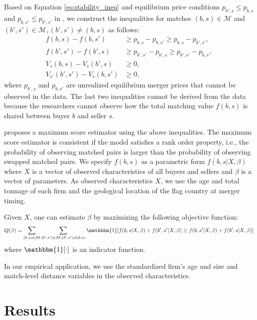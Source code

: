 \documentclass[10pt]{article}
\begin{document}
Based on Equation \eqref{eq:stability_ineq} and equilibrium price conditions $p_{b',s}\le p_{b,s}$ and $p_{b,s'}\le p_{b',s'}$ in \cite{akkus2015ms}, we construct the inequalities for matches $(b,s)\in \mathcal{M}$ and $(b',s')\in \mathcal{M}, (b',s')\neq(b,s)$ as follows:
\begin{align}
    f(b,s)-f(b,s')&\ge p_{b,s}-p_{b,s'}\ge p_{b,s}-p_{b',s'},\label{eq:pairwise_stable_ineq}\\
    f(b',s')-f(b',s)&\ge p_{b',s'}-p_{b',s}\ge p_{b',s'}-p_{b,s},\nonumber\\
    V_s(b,s)-V_s(b',s)&\ge 0,\nonumber\\
    V_{s'}(b',s')-V_s(b,s')&\ge 0,\nonumber
\end{align}
where $p_{b',s}$ and $p_{b,s'}$ are unrealized equilibrium merger prices that cannot be observed in the data. The last two inequalities cannot be derived from the data because the researchers cannot observe how the total matching value $f(b,s)$ is shared between buyer $b$ and seller $s$.

\cite{fox2018qe} proposes a maximum score
estimator using the above inequalities. The maximum score estimator is consistent if the model satisfies a rank order property, i.e., the probability of observing matched pairs is larger than the probability of observing swapped matched pairs. We specify $f(b,s)$ as a parametric form $f(b,s|X,\beta)$ where $X$ is a vector of observed characteristics of all buyers and sellers and $\beta$ is a vector of parameters. As observed characteristics $X$, we use the age and total tonnage of each firm and the geological location of the flag country at merger timing.


Given $X$, one can estimate $\beta$ by maximizing the following objective function:
\begin{align}
    Q(\beta)=\sum_{(b,s)\in \mathcal{M}} \sum_{(b',s')\in \mathcal{M},(b',s')\neq (b,s)} \mathbbm{1}[f(b,s|X,\beta)+ f(b',s'|X,\beta)\ge f(b,s'|X,\beta)+f(b',s|X,\beta)]\label{eq:score_function}
\end{align}
where $\mathbbm{1}[\cdot]$ is an indicator function.

In our empirical application, we use the standardized firm's age and size and match-level distance variables in the observed characteristics.


\section{Results}
\end{document}

